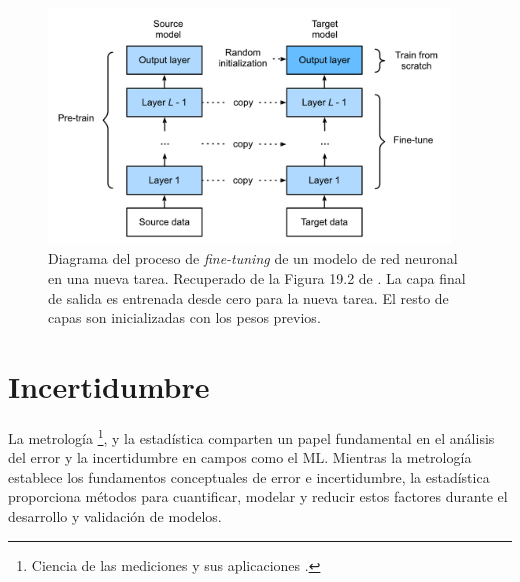 \begin{figure}[h]
    \centering
    \includegraphics[width=0.95\textwidth]{capitulos/cap_02/imagenes/fine-tunning.png}
    \caption[
        Diagrama del proceso de \textit{fine-tuning} de un modelo de red neuronal en una nueva tarea.
    ]{
        Diagrama del proceso de \textit{fine-tuning} de un modelo de red neuronal en una nueva tarea. 
        Recuperado de la Figura 19.2 de \cite{murphy2022}.
        La capa final de salida es entrenada desde cero para la nueva tarea. El resto de capas son 
        inicializadas con los pesos previos. 
    } 
    \label{fig:fine-tuning}
\end{figure}


\section{Incertidumbre}

La metrología%
\footnote{
    Ciencia de las mediciones y sus aplicaciones \cite{jcgm200:2012}.
},
y la estadística comparten un papel fundamental en el análisis del error y la incertidumbre en campos como 
el \acrshort{ML}. Mientras la metrología establece los fundamentos conceptuales de error e incertidumbre, la estadística proporciona métodos para cuantificar, modelar y reducir estos factores durante el desarrollo y validación de modelos.

